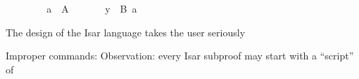 \begin{isabellebody}
\ \ \isamarkupfalse%
\isanewline
\ \ \ \ \isamarkupfalse%
\ {\isachardoublequote}a\ {\isasymin}\ A{\isachardoublequote}\ \isamarkupfalse%
\isanewline
\ \ \ \ \isamarkupfalse%
\ {\isachardoublequote}y\ {\isasymin}\ B\ a{\isachardoublequote}\ \isamarkupfalse%
\isanewline
\ \ \isamarkupfalse%
\isanewline
\isamarkupfalse%
\isamarkupfalse%
%
\isamarkuptrue%
%
\begin{isamarkuptext}%
The design of the Isar language takes the user seriously%
\end{isamarkuptext}%
\isamarkuptrue%
%
\isamarkuptrue%
%
\isamarkuptrue%
%
\isamarkuptrue%
%
\begin{isamarkuptext}%
Improper commands: 
  Observation: every Isar subproof may start with a ``script'' of%
\end{isamarkuptext}%
\isamarkuptrue%
\isamarkupfalse%
\end{isabellebody}%
